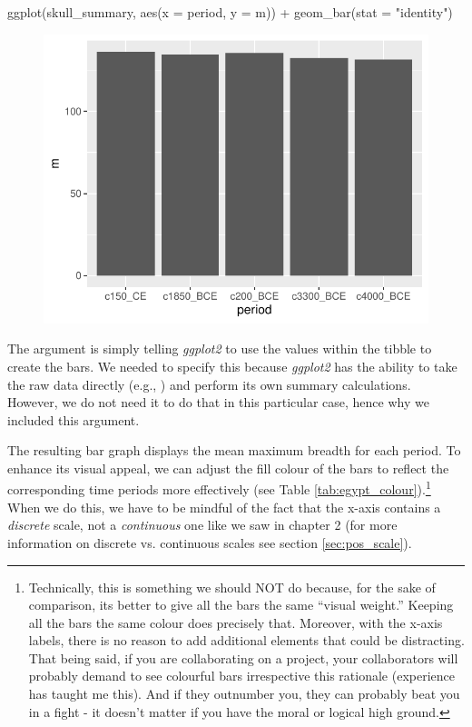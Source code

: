 \begin{inR}
ggplot(skull_summary, aes(x = period, y = m)) +
  geom_bar(stat = "identity")
\end{inR}

\vspace{2em}

\begin{figure}[H]
\includegraphics[scale = .75]{graphics/ch3Figs/bar_1.pdf}
\end{figure}

The argument  is simply telling \textit{ggplot2} to use the values within the  tibble to create the bars.  We needed to specify this because \textit{ggplot2} has the ability to take the raw data directly (e.g., ) and perform its own summary calculations. However, we do not need it to do that in this particular case, hence why we included this argument.

The resulting bar graph displays the mean maximum breadth for each period. To enhance its visual appeal, we can adjust the fill colour of the bars to reflect the corresponding time periods more effectively (see Table \ref{tab:egypt_colour}).\footnote{Technically, this is something we should NOT do because, for the sake of comparison, its better to give all the bars the same ``visual weight.'' Keeping all the bars the same colour does precisely that. Moreover, with the x-axis labels, there is no reason to add additional elements that could be distracting. That being said, if you are collaborating on a project, your collaborators will probably demand to see colourful bars irrespective this rationale (experience has taught me this). And if they outnumber you, they can probably beat you in a fight - it doesn't matter if you have the moral or logical high ground.} When we do this, we have to be mindful of the fact that the x-axis contains a \textit{discrete} scale, not a \textit{continuous} one like we saw in chapter 2 (for more information on discrete vs. continuous scales see section \ref{sec:pos_scale}).

